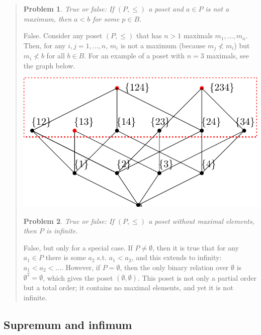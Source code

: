 \documentclass[a4paper, 12pt]{article}
\newtheorem{problem}{Problem}
\newtheorem{problem}{Problem}
\begin{document}
\small
\begin{quote}

\begin{problem}
    True or false: If $(P, \leq) $ a poset and $a \in P$ is not a maximum, then
    $a < b$ for some $p \in B$.
\end{problem}

False. Consider any poset $(P, \leq) $ that has $n > 1$ maximals $m_1, \ldots,
m_n$.
Then, for any $i, j = 1, \ldots, n$, $m_i$ is not a maximum (because $m_j \not<
m_i$) but $m_i \not< b$ for all $b \in B$. For an example of a poset with $n =
3$ maximals, see the graph below.

\begin{center}
\includegraphics[scale=1]{threemaximals}
\end{center}

\begin{problem}
    True or false: If $(P, \leq) $ a poset without maximal elements, then $P$ is
    infinite.
\end{problem}

False, but only for a special case. If $P \neq \emptyset$, then it is true that
for any $a_1 \in P$ there is some $a_2$ s.t. $a_1 < a_2$, and this extends to
infinity: $a_1 < a_2 < \ldots $. However, if $P = \emptyset$, then the only
binary relation over $\emptyset$ is $\emptyset^2 = \emptyset$, which gives the
poset $(\emptyset, \emptyset)$. This poset is not only a partial order but a
total order; it contains no maximal elements, and yet it is not infinite.

\end{quote}
\normalsize


\subsection{Supremum and infimum}
\end{document}
